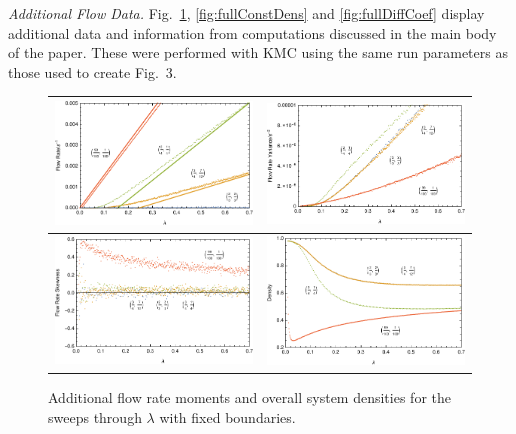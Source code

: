 \documentclass[
reprint,
 amsmath,amssymb,
 aps,
 prl,
]{revtex4-1}
\begin{document}
\textit{Additional Flow Data.} Fig.~\ref{fig:fullLambdaScans}, \ref{fig:fullConstDens} and \ref{fig:fullDiffCoef} display additional data and information from computations discussed in the main body of the paper. These were performed with KMC using the same run parameters as those used to create Fig.~3. 
\begin{figure}[h!]
\vspace{1em}
\caption{\label{fig:fullLambdaScans} Additional flow rate moments and overall system densities for the sweeps through $\lambda$ with fixed boundaries.}
\begin{center}
 \begin{tabular}{c|c}
    \includegraphics[width=0.5\linewidth]{images/newFlowMean} & \includegraphics[width=0.5\linewidth]{images/newFlowVar} \\
    \hline
    \includegraphics[width=0.5\linewidth]{images/newFlowSkew} & \includegraphics[width=0.5\linewidth]{images/newDens} \\
    \end{tabular}
\end{center}
    \vspace{-0em}
\end{figure}
\end{document}
